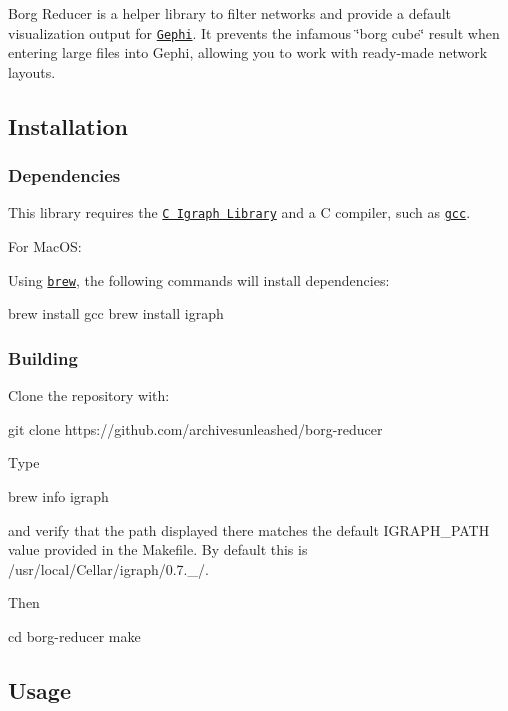 

Borg Reducer is a helper library to filter networks and provide a default visualization output for \href{https://gephi.org/}{\tt Gephi}. It prevents the infamous \char`\"{}borg cube\char`\"{} result when entering large files into Gephi, allowing you to work with ready-\/made network layouts.

\subsection*{Installation}

\subsubsection*{Dependencies}

This library requires the \href{http://igraph.org/c/}{\tt C Igraph Library} and a C compiler, such as \href{https://gcc.gnu.org/}{\tt gcc}.

For Mac\+OS\+:

Using \href{https://brew.sh/}{\tt brew}, the following commands will install dependencies\+:


\begin{DoxyCode}
brew install gcc
brew install igraph
\end{DoxyCode}


\subsubsection*{Building}

Clone the repository with\+:


\begin{DoxyCode}
git clone https://github.com/archivesunleashed/borg-reducer
\end{DoxyCode}


Type


\begin{DoxyCode}
brew info igraph
\end{DoxyCode}


and verify that the path displayed there matches the default I\+G\+R\+A\+P\+H\+\_\+\+P\+A\+TH value provided in the Makefile. By default this is {\ttfamily /usr/local/\+Cellar/igraph/0.7.\+\_/}.

Then


\begin{DoxyCode}
cd borg-reducer
make
\end{DoxyCode}


\subsection*{Usage}

